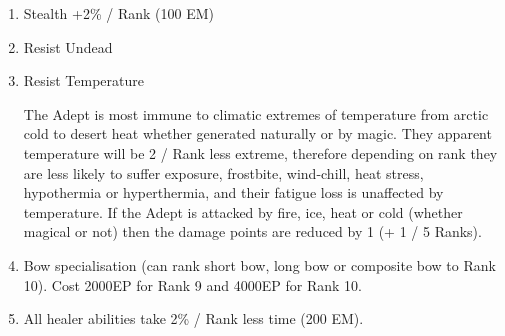 \documentclass[a4paper]{article}
\begin{document}
\begin{multicols*}{3}
\begin{enumerate}
\item
Stealth +2\% / Rank (100 EM)

\item
\begin{talent}{Resist Undead}
\begin{effects}
\end{effects}
\end{talent}

\item
\begin{talent}{Resist Temperature}

\begin{effects}
The Adept is most immune to climatic extremes of temperature from
arctic cold to desert heat whether generated naturally or by magic.
They apparent temperature will be 2\textdegree{} / Rank less extreme,
therefore depending on rank they are less likely to suffer exposure,
frostbite, wind-chill, heat stress, hypothermia or hyperthermia, and
their fatigue loss is unaffected by temperature.  If the Adept is
attacked by fire, ice, heat or cold (whether magical or not) then the
damage points are reduced by 1 (+ 1 / 5 Ranks).
\end{effects}
\end{talent}

\item Bow specialisation (can rank short bow, long bow or composite
bow to Rank 10).  Cost 2000EP for Rank 9 and 4000EP for Rank 10.

\item All healer abilities take 2\% / Rank less time (200 EM).


\end{enumerate}
\end{multicols*}
\end{document}
